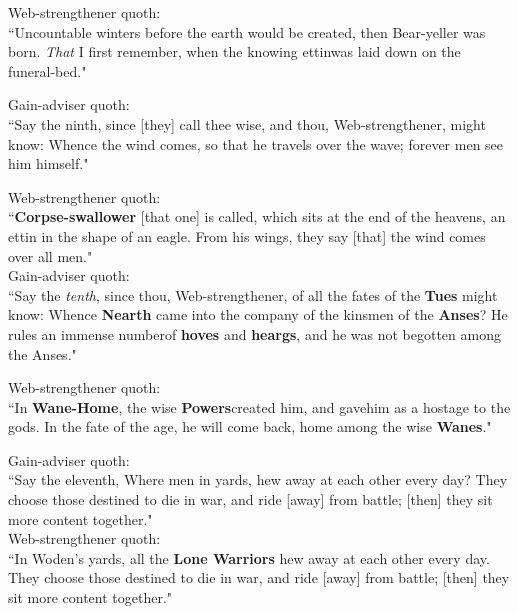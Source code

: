 \bv Web-strengthener quoth: \\ “Uncountable winters before the earth would be created, then Bear-yeller was born. \emph{That} I first remember, when the knowing ettin\footnotemark[60] was laid down on the funeral-bed\footnotemark[61]." \\

\bv Gain-adviser quoth: \\ “Say the ninth, since [they] call thee wise, and thou, Web-strengthener, might know: Whence the wind comes, so that he travels over the wave; forever men see him himself.\footnotemark[65]" \\

\bv Web-strengthener quoth: \\ “\textbf{Corpse-swallower} [that one] is called, which sits at the end of the heavens, an ettin in the shape of an eagle. From his wings, they say [that] the wind comes over all men." \\

\bv Gain-adviser quoth: \\ “Say the \emph{tenth}, since thou, Web-strengthener, of all the fates of the \textbf{Tues} might know: Whence \textbf{Nearth} came into the company of the kinsmen of the \textbf{Anses}? He rules an immense number\footnotemark[68] of \textbf{hoves} and \textbf{heargs}, and he was not begotten among the Anses." \\

\bv Web-strengthener quoth: \\ “In \textbf{Wane-Home}, the wise \textbf{Powers}\footnotemark[69] created him, and gave\footnotemark[70] him as a hostage to the gods. In the fate of the age, he will come back, home among the wise \textbf{Wanes}." \\

\bv Gain-adviser quoth: \\ “Say the eleventh, Where men in yards, hew away at each other every day? They choose those destined to die in war, and ride [away] from battle; [then] they sit more content together." \\

\bv Web-strengthener quoth: \\ “In Woden's yards, all the \textbf{Lone Warriors} hew away at each other every day. They choose those destined to die in war, and ride [away] from battle; [then] they sit more content together." \\

